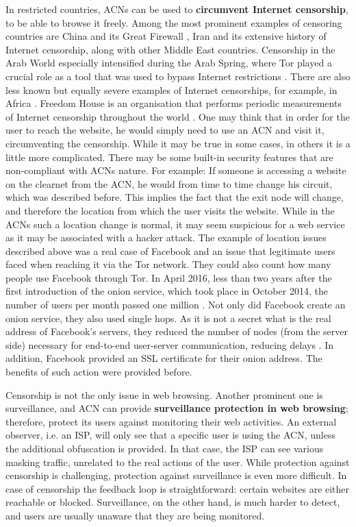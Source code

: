 In restricted countries, ACNs can be used to \textbf{circumvent Internet censorship}, to be able to browse it freely. Among the most prominent examples of censoring countries are China and its Great Firewall \cite{gfw-china}, Iran and its extensive history of Internet censorship, along with other Middle East countries. Censorship in the Arab World especially intensified during the Arab Spring, where Tor played a crucial role as a tool that was used to bypass Internet restrictions \cite{arab-spring}. There are also less known but equally severe examples of Internet censorships, for example, in Africa \cite{africa}. Freedom House is an organisation that performs periodic measurements of Internet censorship throughout the world \cite{freedomhouse_internet}.
One may think that in order for the user to reach the website, he would simply need to use an ACN and visit it, circumventing the censorship. While it may be true in some cases, in others it is a little more complicated. There may be some built-in security features that are non-compliant with ACNs nature. For example: If someone is accessing a website on the clearnet from the ACN, he would from time to time change his circuit, which was described before. This implies the fact that the exit node will change, and therefore the location from which the user visits the website. While in the ACNs such a location change is normal, it may seem suspicious for a web service as it may be associated with a hacker attack.
The example of location issues described above was a real case of Facebook and an issue that legitimate users faced when reaching it via the Tor network. They could also count how many people use Facebook through Tor. In April 2016, less than two years after the first introduction of the onion service, which took place in October 2014, the number of users per month passed one million \cite{facebook-tor-note}. Not only did Facebook create an onion service, they also used single hops. As it is not a secret what is the real address of Facebook's servers, they reduced the number of nodes (from the server side) necessary for end-to-end user-server communication, reducing delays \cite{facebook-tor}. In addition, Facebook provided an SSL certificate for their onion address. The benefits of such action were provided before.

Censorship is not the only issue in web browsing. Another prominent one is surveillance, and ACN can provide \textbf{surveillance protection in web browsing}; therefore, protect its users against monitoring their web activities. An external observer, i.e. an ISP, will only see that a specific user is using the ACN, unless the additional obfuscation is provided. In that case, the ISP can see various masking traffic, unrelated to the real actions of the user. 
While protection against censorship is challenging, protection against surveillance is even more difficult. In case of censorship the feedback loop is straightforward: certain websites are either reachable or blocked. Surveillance, on the other hand, is much harder to detect, and users are usually unaware that they are being monitored.

